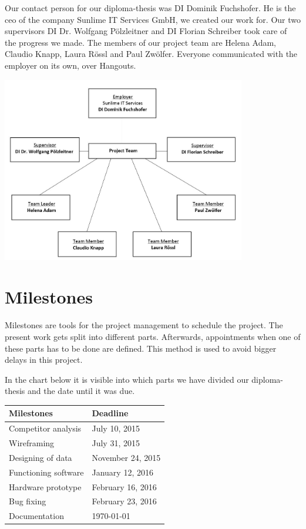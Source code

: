 Our contact person for our diploma-thesis was DI Dominik Fuchshofer. He is the \gls{ceo} of the company Sunlime IT Services GmbH, we created our work for. Our two supervisors DI Dr. Wolfgang Pölzleitner and DI Florian Schreiber took care of the progress we made. The members of our project team are Helena Adam, Claudio Knapp, Laura Rössl and Paul Zwölfer. Everyone communicated with the employer on its own, over Hangouts.
\begin{center}
\includegraphics[width=0.8\textwidth] {bilder/projectdiagram}
\end{center}
\clearpageauthor
\newpage
\section{Milestones}
Milestones are tools for the project management to schedule the project. The present work gets split into different parts. Afterwards, appointments when one of these parts has to be done are defined. This method is used to avoid bigger delays in this project.\newline

In the chart below it is visible into which parts we have divided our diploma-thesis and the date until it was due.\newline
\begin{center}
\begin{tabular}{p{5cm}p{5cm}}
\toprule
\textbf{Milestones} & \textbf{Deadline} \\
\midrule
Competitor analysis & July 10, 2015 \\
Wireframing & July 31, 2015 \\
Designing of data & November 24, 2015 \\
Functioning software & January 12, 2016 \\
Hardware prototype & February 16, 2016 \\
Bug fixing & February 23, 2016 \\
Documentation & \today \\
\bottomrule
\end{tabular}
\end{center}
\newpage
